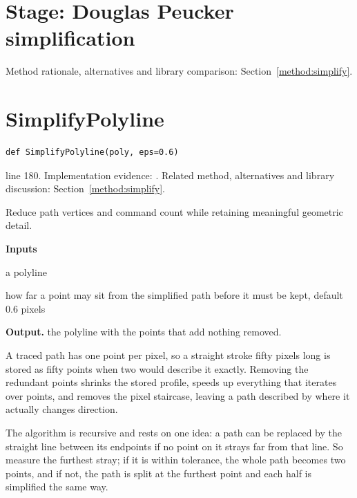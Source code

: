 \section*{Stage: Douglas Peucker simplification}
Method rationale, alternatives and library comparison: Section~\ref{method:simplify}.
\section{SimplifyPolyline}\label{fn:style:SimplifyPolyline}
\begin{lstlisting}[style=sig]
def SimplifyPolyline(poly, eps=0.6)
\end{lstlisting}
 line 180. Implementation evidence: \cite{code2026}. Related method, alternatives and library discussion: Section~\ref{method:simplify}.


Reduce path vertices and command count while retaining meaningful geometric detail.




\noindent\textbf{Inputs}
\begin{description}[leftmargin=2.2em,style=nextline,font=\normalfont\ttfamily]\setlength\itemsep{1pt}
  \item[{poly}] \normalfont a polyline
  \item[{eps}] \normalfont how far a point may sit from the simplified path before it must be kept, default 0.6 pixels
\end{description}

\noindent\textbf{Output.} the polyline with the points that add nothing removed.


A traced path has one point per pixel, so a straight stroke fifty pixels long is stored as fifty points when two would describe it exactly. Removing the redundant points shrinks the stored profile, speeds up everything that iterates over points, and removes the pixel staircase, leaving a path described by where it actually changes direction.


The algorithm \cite{douglaspeucker1973} is recursive and rests on one idea: a path can be replaced by the straight line between its endpoints if no point on it strays far from that line. So measure the furthest stray; if it is within tolerance, the whole path becomes two points, and if not, the path is split at the furthest point and each half is simplified the same way.


